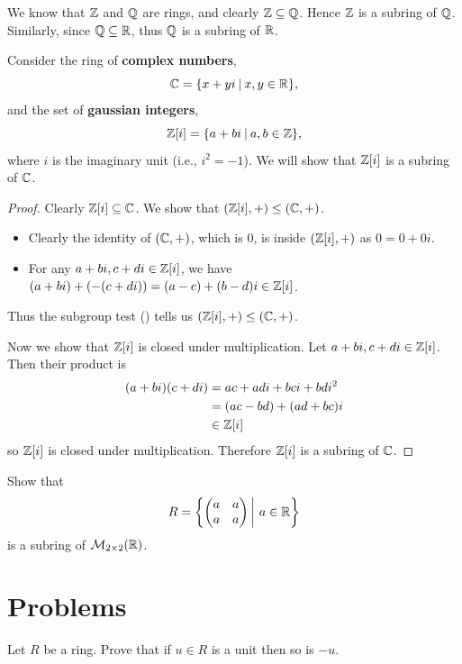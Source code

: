 \begin{example}
    We know that $\mathbb{Z}$ and $\mathbb{Q}$ are rings, and clearly $\mathbb{Z} \subseteq \mathbb{Q}$. Hence $\mathbb{Z}$ is a subring of $\mathbb{Q}$. Similarly, since $\mathbb{Q} \subseteq \mathbb{R}$, thus $\mathbb{Q}$ is a subring of $\mathbb{R}$.
\end{example}

\begin{example}
    Consider the ring of \textbf{complex numbers},
    \[
        \C = \{x + yi \vert x, y \in \R\},
    \]
    and the set of \textbf{gaussian integers},
    \[
        \Z[i] = \{a + bi \vert a,b\in\mathbb{Z}\},
    \]
    where $i$ is the imaginary unit (i.e., $i^2 = -1$). We will show that $\mathbb{Z}[i]$ is a subring of $\mathbb{C}$.
    \begin{proof}
        Clearly $\mathbb{Z}[i] \subseteq \mathbb{C}$. We show that $(\mathbb{Z}[i], +) \leq (\mathbb{C}, +)$.
        \begin{itemize}
            \item Clearly the identity of $(\mathbb{C}, +)$, which is 0, is inside $(\mathbb{Z}[i], +)$ as $0 = 0 + 0i$.
            \item For any $a + bi, c+di \in \mathbb{Z}[i]$, we have $(a+bi) + (-(c+di)) = (a-c) + (b-d)i \in \mathbb{Z}[i]$.
        \end{itemize}
        Thus the subgroup test () tells us $(\mathbb{Z}[i], +) \leq (\mathbb{C}, +)$.

        Now we show that $\mathbb{Z}[i]$ is closed under multiplication. Let $a + bi, c+di \in \mathbb{Z}[i]$. Then their product is
        \begin{align*}
            (a+bi)(c+di) &= ac+adi+bci+bdi^2\\
            &= (ac-bd) + (ad+bc)i\\
            &\in \mathbb{Z}[i]
        \end{align*}
        so $\mathbb{Z}[i]$ is closed under multiplication. Therefore $\mathbb{Z}[i]$ is a subring of $\mathbb{C}$.
    \end{proof}
\end{example}
\begin{exercise}
    Show that
    \[
        R = \left\{\begin{pmatrix}a&a\\a&a\end{pmatrix} \vert a \in \R\right\}
    \]
    is a subring of $\mathcal{M}_{2\times2}(\mathbb{R})$.
\end{exercise}

\newpage

\section{Problems}
\begin{problem}
    Let $R$ be a ring. Prove that if $u \in R$ is a unit then so is $-u$.
\end{problem}

